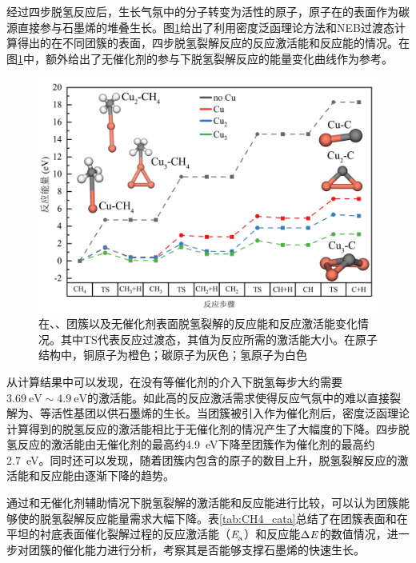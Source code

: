    经过四步脱氢反应后，生长气氛中的分子转变为活性的原子，原子在的表面作为碳源直接参与石墨烯的堆叠生长。图\ref{fig:CG_DFT_CuCHx}给出了利用密度泛函理论方法和NEB过渡态计算得出的在不同团簇的表面，四步脱氢裂解反应的反应激活能和反应能的情况。在图\ref{fig:CG_DFT_CuCHx}中，额外给出了无催化剂的参与下脱氢裂解反应的能量变化曲线作为参考。

    \begin{figure}[htb]
        \includegraphics{pic/CG_DFT_CuCHx.png}
        \caption{在、、团簇以及无催化剂表面脱氢裂解的反应能和反应激活能变化情况。其中TS代表反应过渡态，其值为反应所需的激活能大小。在原子结构中，铜原子为橙色；碳原子为灰色；氢原子为白色}
        \label{fig:CG_DFT_CuCHx}
    \end{figure}

    从计算结果中可以发现，在没有等催化剂的介入下脱氢每步大约需要$\SI{3.69}{\electronvolt}\sim  \SI{4.9}{\electronvolt}$的激活能。如此高的反应激活需求使得反应气氛中的难以直接裂解为、等活性基团以供石墨烯的生长。当团簇被引入作为催化剂后，密度泛函理论计算得到的脱氢反应的激活能相比于无催化剂的情况产生了大幅度的下降。四步脱氢反应的激活能由无催化剂的最高约\SI{4.9}{\electronvolt}下降至团簇作为催化剂的最高约\SI{2.7}{\electronvolt}。同时还可以发现，随着团簇内包含的原子的数目上升，脱氢裂解反应的激活能和反应能由逐渐下降的趋势。

    通过和无催化剂辅助情况下脱氢裂解的激活能和反应能进行比较，可以认为团簇能够使的脱氢裂解反应能量需求大幅下降。表\ref{tab:CH4_cata}总结了在团簇表面和在平坦的衬底表面催化裂解过程的反应激活能（$\it E_{\rm a}^{\rm } \it$）和反应能$\rm{\Delta} \it \it E_{\rm }^{\rm } \it$的数值情况，进一步对团簇的催化能力进行分析，考察其是否能够支撑石墨烯的快速生长。

